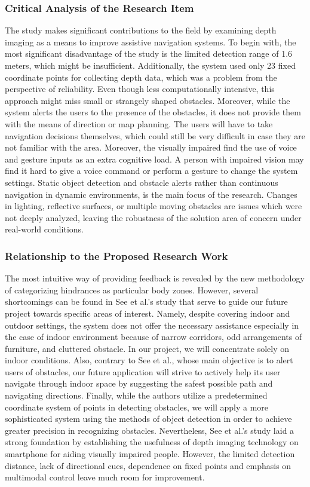 \documentclass{FastFyp}
\begin{document}
\subsubsection{Critical Analysis of the Research Item}  
The study makes significant contributions to the field by examining depth imaging as a means to improve assistive navigation systems. To begin with, the most significant disadvantage of the study is the limited detection range of 1.6 meters, which might be insufficient. Additionally, the system used only 23 fixed coordinate points for collecting depth data, which was a problem from the perspective of reliability. Even though less computationally intensive, this approach might miss small or strangely shaped obstacles. Moreover, while the system alerts the users to the presence of the obstacles, it does not provide them with the means of direction or map planning. The users will have to take navigation decisions themselves, which could still be very difficult in case they are not familiar with the area. Moreover, the visually impaired find the use of voice and gesture inputs as an extra cognitive load. A person with impaired vision may find it hard to give a voice command or perform a gesture to change the system settings. Static object detection and obstacle alerts rather than continuous navigation in dynamic environments, is the main focus of the research. Changes in lighting, reflective surfaces, or multiple moving obstacles are issues which were not deeply analyzed, leaving the robustness of the solution area of concern under real-world conditions.

\subsubsection{Relationship to the Proposed Research Work}  
The most intuitive way of providing feedback is revealed by the new methodology of categorizing hindrances as particular body zones. However, several shortcomings can be found in See et al.'s \cite{ref:see2022smartphone} study that serve to guide our future project towards specific areas of interest. Namely, despite covering indoor and outdoor settings, the system does not offer the necessary assistance especially in the case of indoor environment because of narrow corridors, odd arrangements of furniture, and cluttered obstacle. In our project, we will concentrate solely on indoor conditions. Also, contrary to See et al., whose main objective is to alert users of obstacles, our future application will strive to actively help its user navigate through indoor space by suggesting the safest possible path and navigating directions. Finally, while the authors utilize a predetermined coordinate system of points in detecting obstacles, we will apply a more sophisticated system using the methods of object detection in order to achieve greater precision in recognizing obstacles. Nevertheless, See et al.'s \cite{ref:see2022smartphone} study laid a strong foundation by establishing the usefulness of depth imaging technology on smartphone for aiding visually impaired people. However, the limited detection distance, lack of directional cues, dependence on fixed points and emphasis on multimodal control leave much room for improvement.
\end{document}
